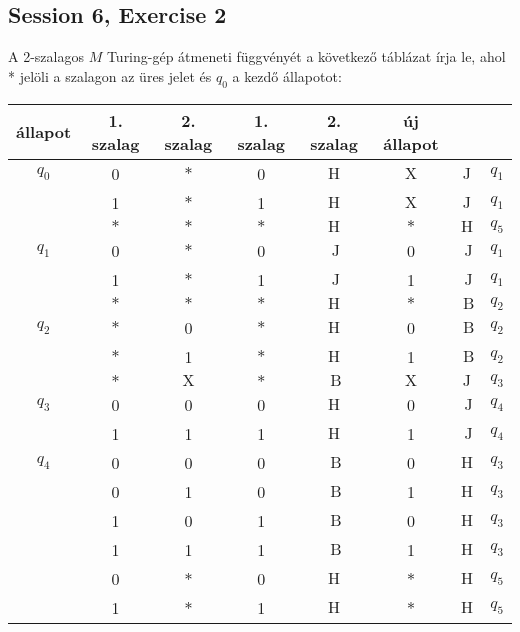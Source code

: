 \subsection{Session 6, Exercise 2}


A 2-szalagos $M$ Turing-gép átmeneti függvényét a következő táblázat írja le, ahol * jelöli a szalagon az üres jelet és $q_{0}$ a kezdő állapotot:

\begin{tabular}{|c|c|c||cc|cc|c|}
\hline állapot & 1. szalag & 2. szalag & 1. szalag & 2. szalag & új állapot \\
\hline$q_{0}$ & 0 & $*$ & 0 & $\mathrm{H}$ & $\mathrm{X}$ & $\mathrm{J}$ & $q_{1}$ \\
& 1 & $*$ & 1 & $\mathrm{H}$ & $\mathrm{X}$ & $\mathrm{J}$ & $q_{1}$ \\
& $*$ & $*$ & $*$ & $\mathrm{H}$ & $*$ & $\mathrm{H}$ & $q_{5}$ \\
\hline$q_{1}$ & 0 & $*$ & 0 & $\mathrm{~J}$ & 0 & $\mathrm{~J}$ & $q_{1}$ \\
& 1 & $*$ & 1 & $\mathrm{~J}$ & 1 & $\mathrm{~J}$ & $q_{1}$ \\
& $*$ & $*$ & $*$ & $\mathrm{H}$ & $*$ & $\mathrm{~B}$ & $q_{2}$ \\
\hline$q_{2}$ & $*$ & 0 & $*$ & $\mathrm{H}$ & 0 & $\mathrm{~B}$ & $q_{2}$ \\
& $*$ & 1 & $*$ & $\mathrm{H}$ & 1 & $\mathrm{~B}$ & $q_{2}$ \\
& $*$ & $\mathrm{X}$ & $*$ & $\mathrm{~B}$ & $\mathrm{X}$ & $\mathrm{J}$ & $q_{3}$ \\
\hline$q_{3}$ & 0 & 0 & 0 & $\mathrm{H}$ & 0 & $\mathrm{~J}$ & $q_{4}$ \\
& 1 & 1 & 1 & $\mathrm{H}$ & 1 & $\mathrm{~J}$ & $q_{4}$ \\
\hline$q_{4}$ & 0 & 0 & 0 & $\mathrm{~B}$ & 0 & $\mathrm{H}$ & $q_{3}$ \\
& 0 & 1 & 0 & $\mathrm{~B}$ & 1 & $\mathrm{H}$ & $q_{3}$ \\
& 1 & 0 & 1 & $\mathrm{~B}$ & 0 & $\mathrm{H}$ & $q_{3}$ \\
& 1 & 1 & 1 & $\mathrm{~B}$ & 1 & $\mathrm{H}$ & $q_{3}$ \\
& 0 & $*$ & 0 & $\mathrm{H}$ & $*$ & $\mathrm{H}$ & $q_{5}$ \\
& 1 & $*$ & 1 & $\mathrm{H}$ & $*$ & $\mathrm{H}$ & $q_{5}$ \\
\hline
\end{tabular}

